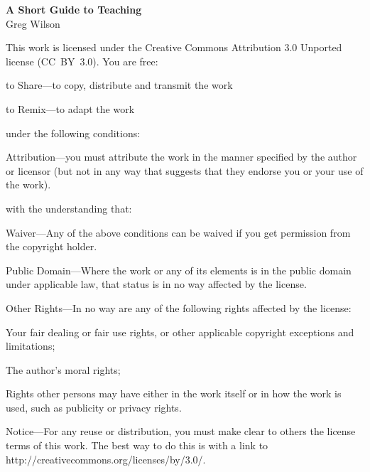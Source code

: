 \newpage

\thispagestyle{empty}

\small
\noindent \textbf{A Short Guide to Teaching} \\
Greg Wilson

\vspace{0.15cm}

\noindent
This work is licensed under the Creative Commons Attribution 3.0
Unported license (CC~BY~3.0).  You are free:

\begin{gitemize}
  \item to Share---to copy, distribute and transmit the work
  \item to Remix---to adapt the work
\end{gitemize}

\noindent
under the following conditions:

\begin{gitemize}
  \item Attribution---you must attribute the work in the manner
    specified by the author or licensor (but not in any way that
    suggests that they endorse you or your use of the work).
\end{gitemize}

\noindent
with the understanding that:

\begin{gitemize}

  \item Waiver---Any of the above conditions can be waived if you get
    permission from the copyright holder.

  \item Public Domain---Where the work or any of its elements is in
    the public domain under applicable law, that status is in no way
    affected by the license.

  \item Other Rights---In no way are any of the following rights
    affected by the license:
    \begin{gitemize}

      \item Your fair dealing or fair use rights, or other applicable
        copyright exceptions and limitations;

      \item The author's moral rights;

      \item Rights other persons may have either in the work itself or
        in how the work is used, such as publicity or privacy rights.

    \end{gitemize}

  \item Notice---For any reuse or distribution, you must make clear to
    others the license terms of this work. The best way to do this is
    with a link to http://creativecommons.org/licenses/by/3.0/.

\end{gitemize}


